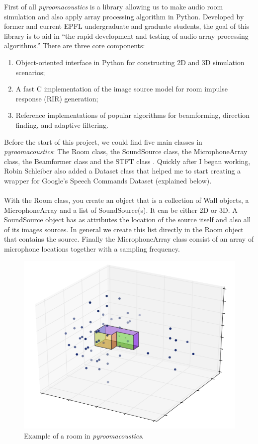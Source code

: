 \documentclass[11pt,a4paper,titlepage]{report}
\providecommand{\tightlist}{%
	\setlength{\itemsep}{0pt}\setlength{\parskip}{0pt}}
\begin{document}
\hspace*{0.6cm}
First of all \textit{pyroomacoustics} is a library allowing us to make audio room simulation  and also apply array processing algorithm in Python. Developed by former and current EPFL undergraduate and graduate students, the goal of this library is to aid in ``the rapid development and testing of audio array processing algorithms.''\cite{pyroom} There are three core components:
\begin{enumerate}
	\tightlist
	\item Object-oriented interface in Python for constructing 2D and 3D simulation scenarios;
	\item A fast C implementation of the image source model for room impulse response (RIR) generation;
	\item Reference implementations of popular algorithms for beamforming, direction finding, and adaptive filtering.
\end{enumerate} 
\hspace*{0.6cm} 
Before the start of this project, we could find five main classes in \textit{pyroomacoustics}: The Room class, the SoundSource class, the MicrophoneArray class, the Beamformer class and the STFT class . Quickly after I began working, Robin Schleiber also added a Dataset class that helped me to start creating a wrapper for Google's Speech Commands Dataset (explained below).\\
\\
\hspace{0.6cm}
With the Room class, you create an object that is a collection of Wall objects, a MicrophoneArray and a list of SoundSource(s). It can be either 2D or 3D.
A SoundSource object has as attributes the location of the source itself and also all of its images sources. In general we create this list directly in the Room object that contains the source.
Finally the MicrophoneArray class consist of an array of microphone locations together with a sampling frequency.
\begin{figure}[h!]
	\centering
	\includegraphics[width=0.7\linewidth]{rapport1}
	\caption[Example of a room in \emph{pyroomacoustics}]{Example of a room in \emph{pyroomacoustics}.}
\end{figure}
\end{document}
